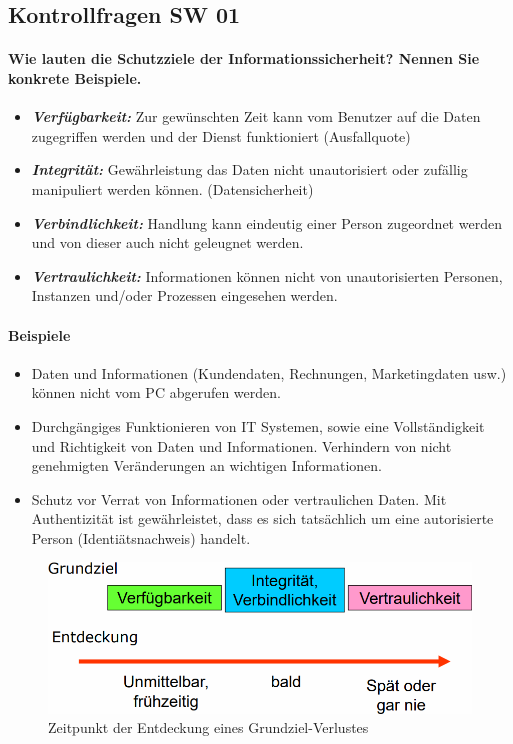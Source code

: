 \documentclass[10pt,a4paper]{article}
\begin{document}
\subsection*{Kontrollfragen SW 01}
\paragraph*{Wie lauten die Schutzziele der Informationssicherheit? Nennen Sie konkrete Beispiele.}
\begin{itemize}[noitemsep,topsep=0pt,leftmargin=*]
    \item \textbf{\textsl{Verfügbarkeit:}} Zur gewünschten Zeit kann vom Benutzer auf die Daten zugegriffen werden und der Dienst funktioniert (Ausfallquote)
    \item \textbf{\textsl{Integrität:}} Gewährleistung das Daten nicht unautorisiert oder zufällig manipuliert werden können. (Datensicherheit)
    \item \textbf{\textsl{Verbindlichkeit:}} Handlung kann eindeutig einer Person zugeordnet werden und von dieser auch nicht geleugnet werden.
    \item \textbf{\textsl{Vertraulichkeit:}} Informationen können nicht von unautorisierten Personen, Instanzen und/oder Prozessen eingesehen werden.
\end{itemize}
\noindent
\paragraph*{Beispiele}
\begin{itemize}[noitemsep,topsep=0pt,leftmargin=*]
    \item Daten und Informationen (Kundendaten, Rechnungen, Marketingdaten usw.) können nicht vom PC abgerufen werden.
    \item Durchgängiges Funktionieren von IT Systemen, sowie eine Vollständigkeit und Richtigkeit von Daten und Informationen. Verhindern von nicht genehmigten Veränderungen an wichtigen Informationen.
    \item Schutz vor Verrat von Informationen oder vertraulichen Daten. Mit Authentizität ist gewährleistet, dass es sich tatsächlich um eine autorisierte Person (Identiätsnachweis) handelt.
\end{itemize}
\begin{figure}[H]
    \begin{center}
    \includegraphics[width=16cm]{images/grundziel-entdeckung.png}
    \caption{Zeitpunkt der Entdeckung eines Grundziel-Verlustes}
    \label{grundziel-entdeckung}
    \end{center}
\end{figure}
\end{document}
